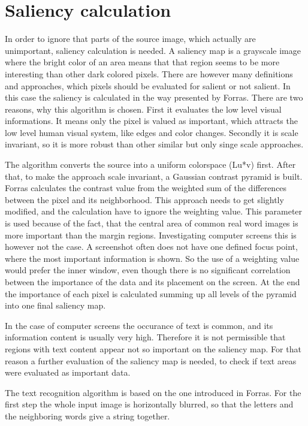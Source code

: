 \documentclass[draft,final]{vutinfth} %
\begin{document}
\section{Saliency calculation}
In order to ignore that parts of the source image, which actually are unimportant, saliency calculation is needed.
A saliency map is a grayscale image where the bright color of an area means that that region seems to be more interesting than other dark colored pixels.
There are however many definitions and approaches, which pixels should be evaluated for salient or not salient.
In this case the saliency is calculated in the way presented by Forras. 
There are two reasons, why this algorithm is chosen.
First it evaluates the low level visual informations.
It means only the pixel is valued as important, which attracts the low level human visual system, like edges and color changes.
Secondly it is scale invariant, so it is more robust than other similar but only singe scale approaches.\par 
The algorithm converts the source into a uniform colorspace (Lu*v) first.
After that, to make the approach scale invariant, a Gaussian contrast pyramid is built.
Forras calculates the contrast value from the weighted sum of  the  differences between the pixel and its neighborhood.
This approach needs to get slightly modified, and the calculation have to ignore the weighting value.
This parameter is used because of the fact, that the central area of common real word images is more important than the margin regions.
Investigating computer screens this is however not the case.
A screenshot often does not have one defined focus point, where the most important information is shown.
So the use of a weighting value would prefer the inner window, even though there is no significant correlation between the importance of the data and its placement on the screen.
At the end the importance of each pixel is calculated summing up all levels of the pyramid into one final saliency map.\par
In the case of computer screens the occurance of text is common, and its information content is usually very high.
Therefore it is not permissible that regions with text content appear not so important on the saliency map.
For that reason a further evaluation of the saliency map is needed, to check if text areas were evaluated as important data.\par 
The text recognition algorithm is based on the one introduced in Forras.
For the first step the whole input image is horizontally blurred, so that the letters and the neighboring words give a string together.
\end{document}
